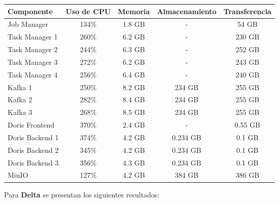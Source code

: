 \begin{longtable}{|p{3cm}|c|c|c|c|}
    \hline
    \textbf{Componente} & \textbf{Uso de CPU} & \textbf{Memoria} & \textbf{Almacenamiento} & \textbf{Transferencia} \\
    \hline
    Job Manager & 134\% & 1.8 GB & - & 54 GB \\
    \hline
    Task Manager 1 & 260\% & 6.2 GB & - & 230 GB \\
    \hline
    Task Manager 2 & 244\% & 6.3 GB & - & 252 GB \\
    \hline
    Task Manager 3 & 272\% & 6.2 GB & - & 243 GB \\
    \hline
    Task Manager 4 & 256\% & 6.4 GB & - & 240 GB \\
    \hline
    Kafka 1 & 250\% & 8.2 GB & 234 GB & 255 GB \\
    \hline
    Kafka 2 & 282\% & 8.4 GB & 234 GB & 255 GB \\
    \hline
    Kafka 3 & 268\% & 8.5 GB & 234 GB & 255 GB \\
    \hline
    Doris Frontend & 370\% & 2.4 GB & - & 0.55 GB \\
    \hline
    Doris Backend 1 & 374\% & 4.2 GB & 0.234 GB & 0.1 GB \\
    \hline
    Doris Backend 2 & 345\% & 4.2 GB & 0.234 GB & 0.1 GB \\
    \hline
    Doris Backend 3 & 356\% & 4.3 GB & 0.234 GB & 0.1 GB \\
    \hline
    MinIO & 127\% & 4.2 GB & 384 GB & 386 GB \\
    \hline
\end{longtable}

Para \textbf{Delta} se presentan los siguientes resultados:


